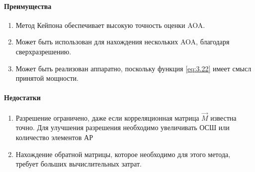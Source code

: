 \paragraph{Преимущества}%
\begin{enumerate}
    \item Метод Кейпона обеспечивает высокую точность оценки AOA.
    \item Может быть использован для нахождения нескольких AOA, благодаря сверхразрешению. 
    \item Может быть реализован аппаратно, поскольку функция \eqref{eq:3.22} имеет смысл принятой мощности.
\end{enumerate}
\paragraph{Недостатки}%
\begin{enumerate}
    \item Разрешение ограничено, даже если корреляционная матрица $\vec M$
    известна точно. Для улучшения разрешения необходимо увеличивать ОСШ или
    количество элементов АР
    \item Нахождение обратной матрицы, которое необходимо для этого метода, требует больших вычислительных затрат.
\end{enumerate}

